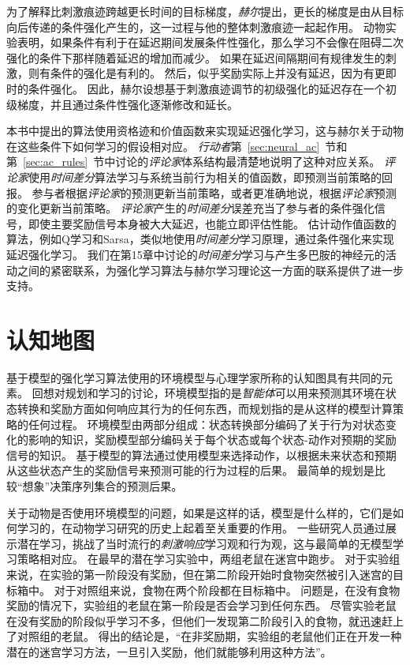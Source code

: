 为了解释比刺激痕迹跨越更长时间的目标梯度，\textit{赫尔}\cite{hull1943principles}提出，更长的梯度是由从目标向后传递的条件强化产生的，这一过程与他的整体刺激痕迹一起起作用。
动物实验表明，如果条件有利于在延迟期间发展条件性强化，那么学习不会像在阻碍二次强化的条件下那样随着延迟的增加而减少。
如果在延迟间隔期间有规律发生的刺激，则有条件的强化是有利的。
然后，似乎奖励实际上并没有延迟，因为有更即时的条件强化。
因此，赫尔设想基于刺激痕迹调节的初级强化的延迟存在一个初级梯度，并且通过条件性强化逐渐修改和延长。


本书中提出的算法使用资格迹和价值函数来实现延迟强化学习，这与赫尔关于动物在这些条件下如何学习的假设相对应。
\textit{行动者}第~\ref{sec:neural_ac}~节和第~\ref{sec:ac_rules}~节中讨论的\textit{评论家}体系结构最清楚地说明了这种对应关系。
\textit{评论家}使用\textit{时间差分}算法学习与系统当前行为相关的值函数，即预测当前策略的回报。
参与者根据\textit{评论家}的预测更新当前策略，或者更准确地说，根据\textit{评论家}预测的变化更新当前策略。
\textit{评论家}产生的\textit{时间差分}误差充当了参与者的条件强化信号，即使主要奖励信号本身被大大延迟，也能立即评估性能。
估计动作值函数的算法，例如Q学习和Sarsa，类似地使用\textit{时间差分}学习原理，通过条件强化来实现延迟强化学习。
我们在第15章中讨论的\textit{时间差分}学习与产生多巴胺的神经元的活动之间的紧密联系，为强化学习算法与赫尔学习理论这一方面的联系提供了进一步支持。


\section{认知地图} \label{sec:cognitive_maps}

基于模型的强化学习算法使用的环境模型与心理学家所称的认知图具有共同的元素。
回想对规划和学习的讨论，环境模型指的是\textit{智能体}可以用来预测其环境在状态转换和奖励方面如何响应其行为的任何东西，而规划指的是从这样的模型计算策略的任何过程。
环境模型由两部分组成：状态转换部分编码了关于行为对状态变化的影响的知识，奖励模型部分编码关于每个状态或每个状态-动作对预期的奖励信号的知识。
基于模型的算法通过使用模型来选择动作，以根据未来状态和预期从这些状态产生的奖励信号来预测可能的行为过程的后果。
最简单的规划是比较“想象”决策序列集合的预测后果。


关于动物是否使用环境模型的问题，如果是这样的话，模型是什么样的，它们是如何学习的，在动物学习研究的历史上起着至关重要的作用。
一些研究人员通过展示潜在学习，挑战了当时流行的\textit{刺激响应}学习观和行为观，这与最简单的无模型学习策略相对应。
在最早的潜在学习实验中，两组老鼠在迷宫中跑步。
对于实验组来说，在实验的第一阶段没有奖励，但在第二阶段开始时食物突然被引入迷宫的目标箱中。
对于对照组来说，食物在两个阶段都在目标箱中。
问题是，在没有食物奖励的情况下，实验组的老鼠在第一阶段是否会学习到任何东西。
尽管实验老鼠在没有奖励的阶段似乎学习不多，但他们一发现第二阶段引入的食物，就迅速赶上了对照组的老鼠。
得出的结论是，“在非奖励期，实验组的老鼠他们正在开发一种潜在的迷宫学习方法，一旦引入奖励，他们就能够利用这种方法”\cite{blodgett1929effect}。



